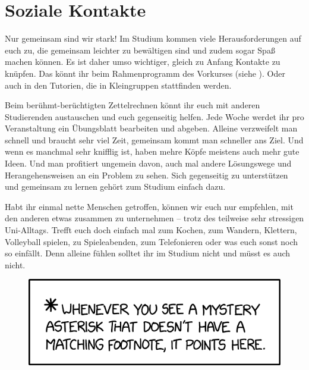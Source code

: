 \section{Soziale Kontakte}
Nur gemeinsam sind wir stark! Im Studium kommen viele Herausforderungen auf euch zu, die gemeinsam leichter zu bewältigen sind und zudem sogar Spaß machen können. Es ist daher umso wichtiger, gleich zu Anfang Kontakte zu knüpfen. Das könnt ihr \zB beim Rahmenprogramm des Vorkurses (siehe ). Oder auch in den Tutorien, die in Kleingruppen stattfinden werden.

Beim berühmt-berüchtigten Zettelrechnen könnt ihr euch mit anderen Studierenden austauschen und euch gegenseitig helfen. Jede Woche werdet ihr pro Veranstaltung ein Übungsblatt bearbeiten und abgeben. Alleine verzweifelt man schnell und braucht sehr viel Zeit, gemeinsam kommt man schneller ans Ziel. Und wenn es manchmal sehr knifflig ist, haben mehre Köpfe meistens auch mehr gute Ideen. Und man profitiert ungemein davon, auch mal andere Lösungswege und Herangehensweisen an ein Problem zu sehen. Sich gegenseitig zu unterstützen und gemeinsam zu lernen gehört zum Studium einfach dazu.

Habt ihr einmal nette Menschen getroffen, können wir euch nur empfehlen, mit den anderen etwas zusammen zu unternehmen -- trotz des teilweise sehr stressigen Uni-Alltags. Trefft euch doch einfach mal zum Kochen, zum Wandern, Klettern, Volleyball spielen, zu Spieleabenden, zum Telefonieren oder was euch sonst noch so einfällt. Denn alleine fühlen solltet ihr im Studium nicht und müsst es auch nicht.

\begin{figure}[hb]
    \centering
    \includegraphics[width=0.8\linewidth]{bilder/mystery_asterisk_destination_2x.png}
\end{figure}

\vfill
